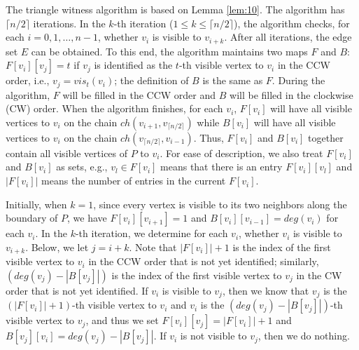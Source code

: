 \documentclass[11pt]{article}
\begin{document}
The triangle witness algorithm is based on Lemma \ref{lem:10}. The
algorithm has $\lceil n/2\rceil$ iterations. In the $k$-th iteration
($1\leq k\leq \lceil n/2\rceil$),
the algorithm checks, for each $i = 0,1,\ldots, n-1$, whether $v_i$ is
visible to $v_{i+k}$. After all iterations, the edge set  
$E$ can be obtained. To this end, the algorithm maintains two maps $F$
and $B$: $F[v_i][v_j]=t$ if $v_j$ is identified as 
the $t$-th visible vertex to $v_i$ 
in the CCW order, i.e., $v_j= vis_t(v_i)$; the definition of $B$ is
the same as $F$. During the algorithm, $F$ will be filled in the CCW
order and $B$ will be filled in the clockwise (CW) order. When the algorithm 
finishes, for each $v_i$, $F[v_i]$ will have all visible vertices to $v_i$ on
the chain $ch(v_{i+1},v_{\lceil n/2\rceil})$ while $B[v_i]$ will have
all visible vertices to $v_i$ on the chain $ch(v_{\lceil
n/2\rceil}, v_{i-1})$. Thus, $F[v_i]$ and $B[v_i]$ together contain all visible
vertices of $P$ to $v_i$. 
For ease of description, we also treat $F[v_i]$ and
$B[v_i]$ as sets, e.g., $v_l\in F[v_i]$ means that there is an entry
$F[v_i][v_l]$ and $|F[v_i]|$ means the number of entries in the
current $F[v_i]$.  

Initially, when $k=1$, since every
vertex is visible to its two neighbors along the boundary of $P$, we have $F[v_i][v_{i+1}]=1$
and $B[v_i][v_{i-1}]=deg(v_i)$ for each $v_i$. In the $k$-th
iteration, we determine for each $v_i$, whether $v_i$ is visible to
$v_{i+k}$. Below, we let $j=i+k$. 
Note that $|F[v_i]|+1$ is the index of the first visible
vertex to $v_i$ in the CCW order that is not yet identified;
similarly, $(deg(v_{j})-|B[v_{j}]|)$ is the index of the first
visible vertex to $v_{j}$ in the CW order that is not yet
identified. If $v_i$ is visible to $v_{j}$, then we know that
$v_{j}$ is the $(|F[v_i]|+1)$-th visible vertex to $v_i$ and $v_i$
is the $(deg(v_{j})-|B[v_{j}]|)$-th visible vertex to $v_{j}$,
and thus we set $F[v_i][v_{j}]=|F[v_i]|+1$ and
$B[v_{j}][v_i]=deg(v_{j})-|B[v_{j}]|$. If $v_i$ is not visible to
$v_{j}$, then we do nothing. 
\end{document}
